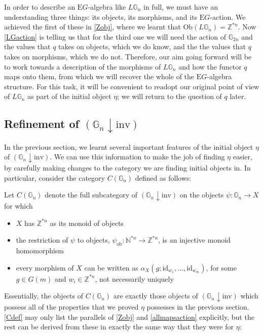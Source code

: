 \documentclass{amsart} %
\begin{document}
In order to describe an $\mathrm{E}G$-algebra like $L\mathbb{G}_n$ in full, we must have an understanding three things: its objects, its morphisms, and its $\mathrm{E}G$-action. We achieved the first of these in \cref{Zobj}, where we learnt that $\mathrm{Ob}(L\mathbb{G}_n) = \mathbb{Z}^{\ast n}$. Now \cref{LGaction} is telling us that for the third one we will need the action of $\mathbb{G}_{2n}$ and the values that $q$ takes on objects, which we do know, and the the values that $q$ takes on morphisms, which we do not. Therefore, our aim  going forward will be to work towards a description of the morphisms of $L\mathbb{G}_n$ and how the functor $q$ maps onto them, from which we will recover the whole of the $\mathrm{E}G$-algebra structure. For this task, it will be convenient to readopt our original point of view of $L\mathbb{G}_n$ as part of the initial object $\eta$; we will return to the question of $q$ later. 

\subsection{Refinement of $(\mathbb{G}_n \downarrow \mathrm{inv})$}

In the previous section, we learnt several important features of the initial object $\eta$ of $(\mathbb{G}_n \downarrow \mathrm{inv})$. We can use this information to make the job of finding $\eta$ easier, by carefully making changes to the category we are finding initial objects in. In particular, consider the category $C(\mathbb{G}_n)$ defined as follows:

\begin{defn}\label{Cdef} Let $C(\mathbb{G}_n)$ denote the full subcategory of $(\mathbb{G}_n \downarrow \mathrm{inv})$ on the objects $\psi: \mathbb{G}_n \to X$ for which
\begin{itemize}
\item $X$ has $\mathbb{Z}^{\ast n}$ as its monoid of objects
\item the restriction of $\psi$ to objects, $\psi_{\mathrm{ob}}: \mathbb{N}^{\ast n} \to \mathbb{Z}^{\ast n}$, is an injective monoid homomorphism
\item every morphism of $X$ can be written as $\alpha_X(g; \mathrm{id}_{w_1}, ..., \mathrm{id}_{w_m})$, for some $g \in G(m)$ and $w_i \in \mathbb{Z}^{\ast n}$, not necessarily uniquely
\end{itemize}
\end{defn}

Essentially, the objects of $C(\mathbb{G}_n)$ are exactly those objects of $(\mathbb{G}_n \downarrow \mathrm{inv})$ which possess all of the properties that we proved $\eta$ possesses in the previous section. \cref{Cdef} may only list the parallels of \cref{Zobj} and \cref{allmapsaction} explicitly, but the rest can be derived from these in exactly the same way that they were for $\eta$:
\end{document}
